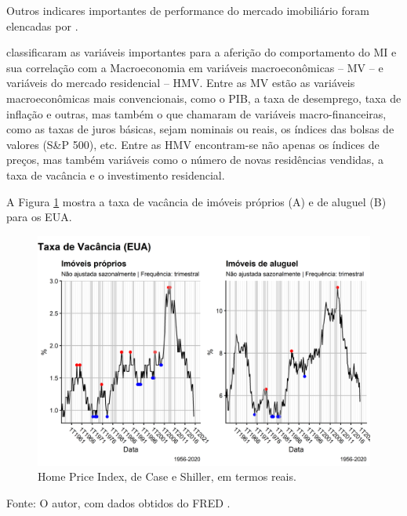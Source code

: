 \documentclass[
	12pt,				%
	oneside,			%
	a4paper,			%
	chapter=TITLE,		%
	section=TITLE,		%
	english,			%
	brazil				%
	]{abntex2}
\newcommand{\bcenter}{\begin{center}}
\newcommand{\ecenter}{\end{center}}
\begin{document}
Outros indicares importantes de performance do mercado imobiliário foram
elencadas por \textcite{macroHousing}.

\textcite{macroHousing} classificaram as variáveis importantes para a aferição do
comportamento do \gls{MI} e sua correlação com a Macroeconomia em variáveis
macroeconômicas -- \gls{MV} -- e variáveis do mercado residencial -- \gls{HMV}.
Entre as \gls{MV} estão as variáveis macroeconômicas mais convencionais, como o
\gls{PIB}, a taxa de desemprego, taxa de inflação e outras, mas também o que
\textcite{macroHousing} chamaram de variáveis macro-financeiras, como as taxas de juros
básicas, sejam nominais ou reais, os índices das bolsas de valores (S\&P 500),
etc. Entre as \gls{HMV} encontram-se não apenas os índices de preços, mas também
variáveis como o número de novas residências vendidas, a taxa de vacância e o
investimento residencial.

A Figura \ref{fig:vacancyRate} mostra a taxa de vacância de imóveis próprios (A)
e de aluguel (B) para os EUA.
\begin{figure}[H]

{\centering \includegraphics[width=1\linewidth]{images/vacancyRate-1} 

}

\caption{Home Price Index, de Case e Shiller, em termos reais.}\label{fig:vacancyRate}
\end{figure}
\bcenter

Fonte: O autor, com dados obtidos do FRED \autocite{RHVRUSQ156N,RRVRUSQ156N}.
\ecenter
\end{document}
